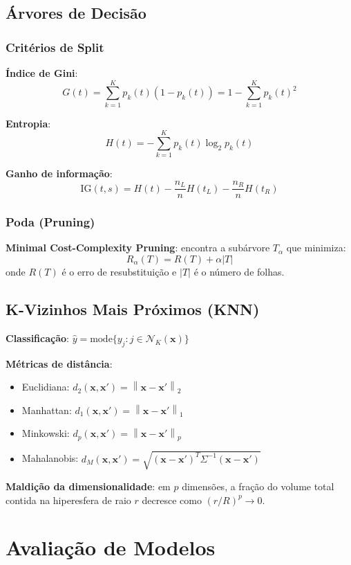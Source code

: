 \documentclass[12pt,a4paper,twoside]{book}
\theoremstyle{definition}
\theoremstyle{remark}
\newcommand{\bx}{\bm{x}}
\newcommand{\norm}[1]{\left\|#1\right\|}
\begin{document}
\section{Árvores de Decisão}

\subsection{Critérios de Split}

\textbf{Índice de Gini}:
\[
G(t) = \sum_{k=1}^K p_k(t)(1-p_k(t)) = 1 - \sum_{k=1}^K p_k(t)^2
\]

\textbf{Entropia}:
\[
H(t) = -\sum_{k=1}^K p_k(t)\log_2 p_k(t)
\]

\textbf{Ganho de informação}:
\[
\mathrm{IG}(t, s) = H(t) - \frac{n_L}{n}H(t_L) - \frac{n_R}{n}H(t_R)
\]

\subsection{Poda (Pruning)}

\textbf{Minimal Cost-Complexity Pruning}: encontra a subárvore $T_\alpha$ que minimiza:
\[
R_\alpha(T) = R(T) + \alpha |T|
\]
onde $R(T)$ é o erro de resubstituição e $|T|$ é o número de folhas.

\section{K-Vizinhos Mais Próximos (KNN)}

\textbf{Classificação}: $\hat{y} = \mathrm{mode}\{y_j : j \in \mathcal{N}_K(\bx)\}$

\textbf{Métricas de distância}:
\begin{itemize}
  \item Euclidiana: $d_2(\bx,\bx') = \norm{\bx - \bx'}_2$
  \item Manhattan: $d_1(\bx,\bx') = \norm{\bx - \bx'}_1$
  \item Minkowski: $d_p(\bx,\bx') = \norm{\bx - \bx'}_p$
  \item Mahalanobis: $d_M(\bx,\bx') = \sqrt{(\bx-\bx')^T\Sigma^{-1}(\bx-\bx')}$
\end{itemize}

\textbf{Maldição da dimensionalidade}: em $p$ dimensões, a fração do volume total contida na hiperesfera de raio $r$ decresce como $(r/R)^p \to 0$.

\chapter{Avaliação de Modelos}
\end{document}
